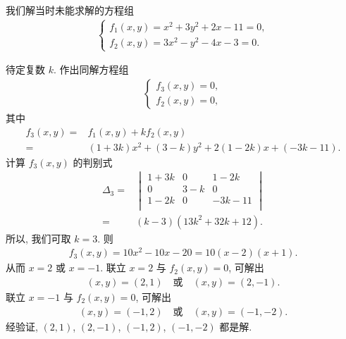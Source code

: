\begingroup
\renewcommand\thmcontinues[1]{%
    续%
}
\begin{example}[continues=emp:A0301]
    我们解当时未能求解的方程组
    \begin{align*}
        \begin{cases}
            f_1 (x, y) = x^2 + 3y^2 + 2x - 11 = 0, \\
            f_2 (x, y) = 3x^2 - y^2 - 4x - 3 = 0.
        \end{cases}
    \end{align*}

    待定复数 \(k\).
    作出同解方程组
    \begin{align*}
        \begin{cases}
            f_3 (x, y) = 0, \\
            f_2 (x, y) = 0,
        \end{cases}
    \end{align*}
    其中
    \begin{align*}
        f_3 (x, y)
        = {} & f_1 (x, y) + kf_2 (x, y)                    \\
        = {} & (1+3k)x^2 + (3-k)y^2 + 2(1-2k)x + (-3k-11).
    \end{align*}
    计算 \(f_3 (x, y)\) 的判别式
    \begin{align*}
        \Delta_3
        = {} & \begin{vmatrix}
                   1+3k & 0   & 1-2k   \\
                   0    & 3-k & 0      \\
                   1-2k & 0   & -3k-11 \\
               \end{vmatrix}      \\
        = {} & (k-3)(13k^2 + 32k + 12).
    \end{align*}
    所以, 我们可取 \(k = 3\).
    则
    \begin{align*}
        f_3 (x, y) = 10x^2 - 10x - 20 = 10(x - 2)(x + 1).
    \end{align*}
    从而 \(x = 2\) 或 \(x = -1\).
    联立 \(x = 2\) 与 \(f_2 (x, y) = 0\),
    可解出
    \begin{align*}
        (x, y) = (2, 1)
        \quad \text{或} \quad
        (x, y) = (2, -1).
    \end{align*}
    联立 \(x = -1\) 与 \(f_2 (x, y) = 0\),
    可解出
    \begin{align*}
        (x, y) = (-1, 2)
        \quad \text{或} \quad
        (x, y) = (-1, -2).
    \end{align*}
    经验证,
    \((2, 1)\), \((2, -1)\), \((-1, 2)\), \((-1, -2)\)
    都是解.
\end{example}
\endgroup

